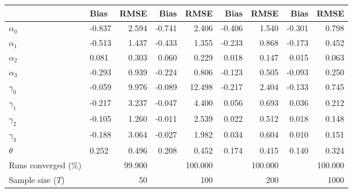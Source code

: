 
\begin{tabular}[t]{llrrrrrrr}
\toprule
  & Bias & RMSE & Bias & RMSE & Bias & RMSE & Bias & RMSE\\
\midrule
$\alpha_{0}$ & -0.837 & 2.594 & -0.741 & 2.406 & -0.406 & 1.540 & -0.301 & 0.798\\
$\alpha_{1}$ & -0.513 & 1.437 & -0.433 & 1.355 & -0.233 & 0.868 & -0.173 & 0.452\\
$\alpha_{2}$ & 0.081 & 0.303 & 0.060 & 0.229 & 0.018 & 0.147 & 0.015 & 0.063\\
$\alpha_{3}$ & -0.293 & 0.939 & -0.224 & 0.806 & -0.123 & 0.505 & -0.093 & 0.250\\
$\gamma_{0}$ & -0.059 & 9.976 & -0.089 & 12.498 & -0.217 & 2.404 & -0.133 & 0.745\\
$\gamma_{1}$ & -0.217 & 3.237 & -0.047 & 4.400 & 0.056 & 0.693 & 0.036 & 0.212\\
$\gamma_{2}$ & -0.105 & 1.260 & -0.011 & 2.539 & 0.022 & 0.512 & 0.018 & 0.148\\
$\gamma_{3}$ & -0.188 & 3.064 & -0.027 & 1.982 & 0.034 & 0.604 & 0.010 & 0.151\\
$\theta$ & 0.252 & 0.496 & 0.208 & 0.452 & 0.174 & 0.415 & 0.140 & 0.324\\
Runs converged (\%) &  & 99.900 &  & 100.000 &  & 100.000 &  & 100.000\\
Sample size ($T$) &  & 50 &  & 100 &  & 200 &  & 1000\\
\bottomrule
\end{tabular}
